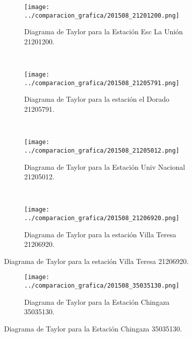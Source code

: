 \begin{figure}[H]
\begin{subfigure}[normla]{0.5\textwidth}
\caption{Diagrama de Taylor para la Estación Esc La Unión 21201200.}
\texttt{[image: ../comparacion\_grafica/201508\_21201200.png]}
\end{subfigure}
~
\begin{subfigure}[normla]{0.5\textwidth}
\caption{Diagrama de Taylor para la estación el Dorado 21205791.}
\texttt{[image: ../comparacion\_grafica/201508\_21205791.png]}
\end{subfigure}
~
\begin{subfigure}[normla]{0.5\textwidth}
\caption{Diagrama de Taylor para la Estación Univ Nacional 21205012.}
\texttt{[image: ../comparacion\_grafica/201508\_21205012.png]}
\end{subfigure}
~
\begin{subfigure}[normla]{0.5\textwidth}
\caption{Diagrama de Taylor para la estación Villa Teresa 21206920.}
\texttt{[image: ../comparacion\_grafica/201508\_21206920.png]}
\end{subfigure}
\end{figure}

\begin{figure}[H]
\begin{subfigure}[normla]{0.5\textwidth}
\caption{Diagrama de Taylor para la Estación Chingaza 35035130.}
\texttt{[image: ../comparacion\_grafica/201508\_35035130.png]}
\end{subfigure}


\end{figure}

\newpage

